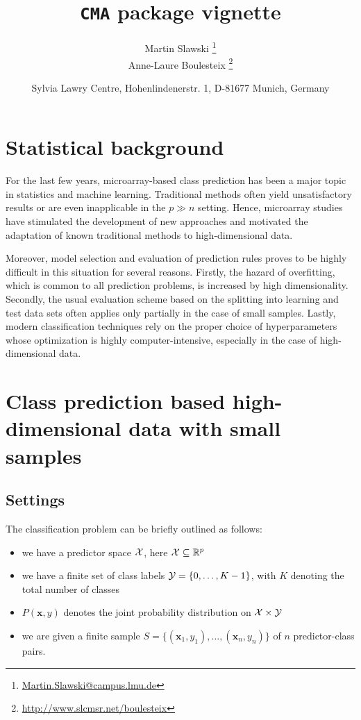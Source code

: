 

\title{\large{\texttt{CMA}} package vignette}
\author{Martin Slawski \footnote{\url{Martin.Slawski@campus.lmu.de}}\\
        Anne-Laure Boulesteix \footnote{\url{http://www.slcmsr.net/boulesteix}}}

\usepackage{e:/R_installation/share/texmf/Sweave}

\date{\normalsize{Sylvia Lawry Centre, Hohenlindenerstr. 1, D-81677 Munich, Germany}}
\maketitle


\section{Statistical background}
\label{sec:0}
For the last few years, microarray-based class prediction has been a major
topic in statistics and machine learning. 
Traditional methods often yield unsatisfactory results or are 
even inapplicable in the $p \gg n$ setting.
Hence, microarray studies have stimulated the development of 
new approaches and motivated the adaptation of known traditional methods
to high-dimensional data.
 
Moreover, model selection and evaluation of prediction rules 
proves to be highly difficult in this situation for several reasons.
Firstly, the hazard of overfitting, which is common to all prediction problems,
is increased by high dimensionality. Secondly, the usual evaluation scheme based
on the splitting  into learning and test data sets often applies only partially in
the case of small samples.
Lastly, modern classification techniques rely on the proper choice of hyperparameters 
whose optimization is highly computer-intensive, especially in the case of
high-dimensional data.


\section{Class prediction based high-dimensional data with small samples}\label{sec:1}
\subsection{Settings}
The classification problem can be briefly outlined as follows:
\begin{itemize}
\item we have a predictor space $\mathcal X$, here $\mathcal X \subseteq {\mathbb R}^p$
\item we have a finite set of class labels $\mathcal Y = \{0,\ldots,K-1\}$,
      with $K$ denoting the total number of classes
\item $P(\bm{x},y)$ denotes the joint probability distribution on $\mathcal X \times \mathcal Y$
\item we are given a finite sample $S = \{(\bm{x}_1,y_1),\ldots,(\bm{x}_n,y_n) \}$
      of $n$ predictor-class pairs.
\end{itemize}

